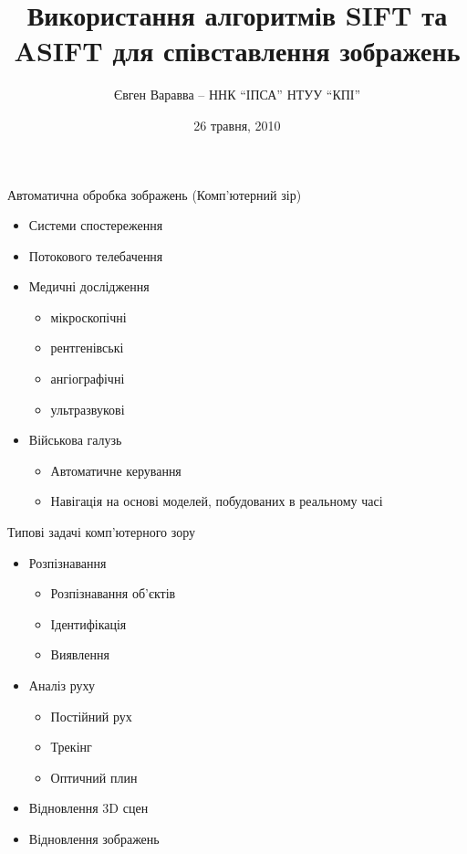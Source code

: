 \documentclass{beamer}
\title[SIFT та ASIFT для співставлення зображень]{Використання алгоритмів SIFT та ASIFT для співставлення зображень}
\author{Євген Варавва -- ННК ``ІПСА'' НТУУ ``КПІ''}
\institute{XII Міжнародна науково-технічна конференція САІТ-2010}
\date{26 травня, 2010}
\begin{document}
\newcommand{\coolfigure}[3]{\coolwfigure{#1}{#2}{#3}{\textwidth}}

\newcommand{\coolwfigure}[4]{\begin{figure}[!ht]\begin{center}\texttt{[image: \#1]}\end{center}\caption{#2}\label{#3}\end{figure}}



\begin{frame}
  \titlepage
\end{frame}


\begin{frame}{Автоматична обробка зображень (Комп'ютерний зір)}
  \begin{itemize}
    \item Системи спостереження
    \item Потокового телебачення
    \item Медичні дослідження
      \begin{itemize}
        \item мікроскопічні
        \item рентгенівські
        \item ангіографічні
        \item ультразвукові
      \end{itemize}
    \item Військова галузь
      \begin{itemize}
        \item Автоматичне керування 
        \item Навігація на основі моделей, побудованих в реальному часі
      \end{itemize}
  \end{itemize}
\end{frame}

\begin{frame}{Типові задачі комп'ютерного зору}
  \begin{itemize}
    \item Розпізнавання
      \begin{itemize}
        \item Розпізнавання об'єктів
        \item Ідентифікація
        \item Виявлення
      \end{itemize}
    \item Аналіз руху
      \begin{itemize}
        \item Постійний рух
        \item Трекінг
        \item Оптичний плин
      \end{itemize}
    \item Відновлення 3D сцен
    \item Відновлення зображень
  \end{itemize}
\end{frame}
\end{document}
